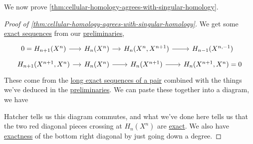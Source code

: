 We now prove \autoref{thm:cellular-homology-agrees-with-singular-homology}.
\begin{proof}[Proof of \autoref{thm:cellular-homology-agrees-with-singular-homology}]\label{pf:thm:cellular-homology-agrees-with-singular-homology}
	We get some \hyperref[def:exact-sequence]{exact sequences} from our \hyperref[lma:lec34]{preliminaries},
	\[
		\begin{tikzcd}[column sep=small,row sep=tiny]
			{0=H_{n+1}(X^n)} & {H_n(X^{n})} & {H_n(X^{n}, X^{n+1})} & {H_{n-1}(X^{n,-1})} \\
			{H_{n+1}(X^{n+1}, X^n)} & {H_n(X^n)} & {H_n(X^{n+1})} & {H_n(X^{n+1}, X^n)=0}
			\arrow[from=1-2, to=1-3]
			\arrow[from=1-3, to=1-4]
			\arrow[from=1-1, to=1-2]
			\arrow[from=2-1, to=2-2]
			\arrow[from=2-2, to=2-3]
			\arrow[from=2-3, to=2-4]
		\end{tikzcd}
	\]
	These come from the \hyperref[thm:long-exact-sequence-of-a-pair]{long exact sequences of a pair} combined with the things we've
	deduced in the \hyperref[lma:lec34]{preliminaries}. We can paste these together into a diagram, we have
	\par
	\par Hatcher\cite{hatcher2002algebraic} tells us this diagram commutes, and what we've done here tells us that the two red diagonal pieces
	crossing at \(H_n(X^n)\) are \hyperref[def:exact]{exact}. We also have \hyperref[def:exact]{exactness} of the bottom right diagonal
	by just going down a degree.


\end{proof}
